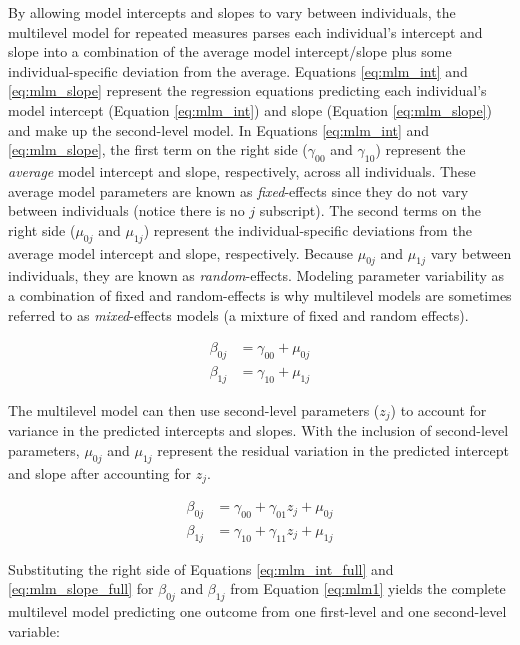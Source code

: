 \documentclass[
]{article}
\begin{document}
By allowing model intercepts and slopes to vary between individuals, the multilevel model for repeated measures parses each individual's intercept and slope into a combination of the average model intercept/slope plus some individual-specific deviation from the average. Equations \ref{eq:mlm_int} and \ref{eq:mlm_slope} represent the regression equations predicting each individual's model intercept (Equation \ref{eq:mlm_int}) and slope (Equation \ref{eq:mlm_slope}) and make up the second-level model. In Equations \ref{eq:mlm_int} and \ref{eq:mlm_slope}, the first term on the right side (\(\gamma_{00}\) and \(\gamma_{10}\)) represent the \emph{average} model intercept and slope, respectively, across all individuals. These average model parameters are known as \emph{fixed}-effects since they do not vary between individuals (notice there is no \(j\) subscript). The second terms on the right side (\(\mu_{0j}\) and \(\mu_{1j}\)) represent the individual-specific deviations from the average model intercept and slope, respectively. Because \(\mu_{0j}\) and \(\mu_{1j}\) vary between individuals, they are known as \emph{random}-effects. Modeling parameter variability as a combination of fixed and random-effects is why multilevel models are sometimes referred to as \emph{mixed}-effects models (a mixture of fixed and random effects).

\begin{align}
\beta_{0j}&=\gamma_{00}+\mu_{0j}\label{eq:mlm_int}\\
\beta_{1j}&=\gamma_{10}+\mu_{1j}\label{eq:mlm_slope}
\end{align}

\noindent
The multilevel model can then use second-level parameters (\(z_{j}\)) to account for variance in the predicted intercepts and slopes. With the inclusion of second-level parameters, \(\mu_{0j}\) and \(\mu_{1j}\) represent the residual variation in the predicted intercept and slope after accounting for \(z_{j}\).

\begin{align}
\beta_{0j}&=\gamma_{00}+\gamma_{01}z_{j}+\mu_{0j}\label{eq:mlm_int_full}\\
\beta_{1j}&=\gamma_{10}+\gamma_{11}z_{j}+\mu_{1j}\label{eq:mlm_slope_full}
\end{align}

\noindent
Substituting the right side of Equations \ref{eq:mlm_int_full} and \ref{eq:mlm_slope_full} for \(\beta_{0j}\) and \(\beta_{1j}\) from Equation \ref{eq:mlm1} yields the complete multilevel model predicting one outcome from one first-level and one second-level variable:
\end{document}
